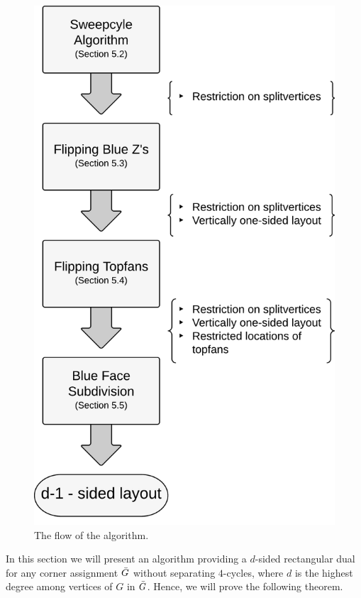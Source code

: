   \begin{figure}
    \hfill
    \includegraphics[scale=.37]{unifiedAlgo/img/algoflowext2.pdf}
    \caption{The flow of the algorithm.}
    \label{fig:algo:algoflow}
  \end{figure}

  In this section we will present an algorithm providing a $d$-sided rectangular dual for any corner assignment $\bar{G}$ without separating $4$-cycles, where $d$ is the highest degree among vertices of $G$ in $\bar{G}$.  Hence, we will prove the following theorem.

